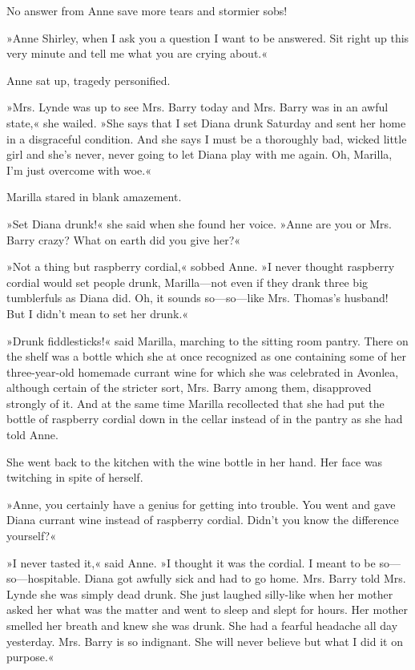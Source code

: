 No answer from Anne save more tears and stormier sobs!

»Anne Shirley, when I ask you a question I want to be answered. Sit right up this very minute and tell me what you are crying about.«

Anne sat up, tragedy personified.

»Mrs. Lynde was up to see Mrs. Barry today and Mrs. Barry was in an awful state,« she wailed. »She says that I set Diana drunk Saturday and sent her home in a disgraceful condition. And she says I must be a thoroughly bad, wicked little girl and she's never, never going to let Diana play with me again. Oh, Marilla, I'm just overcome with woe.«

Marilla stared in blank amazement.

»Set Diana drunk!« she said when she found her voice. »Anne are you or Mrs. Barry crazy? What on earth did you give her?«

»Not a thing but raspberry cordial,« sobbed Anne. »I never thought raspberry cordial would set people drunk, Marilla—not even if they drank three big tumblerfuls as Diana did. Oh, it sounds so—so—like Mrs. Thomas's husband! But I didn't mean to set her drunk.«

»Drunk fiddlesticks!« said Marilla, marching to the sitting room pantry. There on the shelf was a bottle which she at once recognized as one containing some of her three-year-old homemade currant wine for which she was celebrated in Avonlea, although certain of the stricter sort, Mrs. Barry among them, disapproved strongly of it. And at the same time Marilla recollected that she had put the bottle of raspberry cordial down in the cellar instead of in the pantry as she had told Anne.

She went back to the kitchen with the wine bottle in her hand. Her face was twitching in spite of herself.

»Anne, you certainly have a genius for getting into trouble. You went and gave Diana currant wine instead of raspberry cordial. Didn't you know the difference yourself?«

»I never tasted it,« said Anne. »I thought it was the cordial. I meant to be so—so—hospitable. Diana got awfully sick and had to go home. Mrs. Barry told Mrs. Lynde she was simply dead drunk. She just laughed silly-like when her mother asked her what was the matter and went to sleep and slept for hours. Her mother smelled her breath and knew she was drunk. She had a fearful headache all day yesterday. Mrs. Barry is so indignant. She will never believe but what I did it on purpose.«

